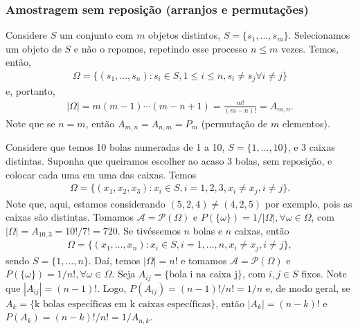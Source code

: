 \documentclass[../Notas.tex]{subfiles}
\begin{document}
\subsubsection{Amostragem sem reposição (arranjos e permutações)}
Considere $S$ um conjunto com $m$ objetos distintos, $S = \{s_1, \dots, s_m\}$. Selecionamos um objeto de $S$ e não o repomos, repetindo esse processo $n \leq m$ vezes. Temos, então,
\begin{align*}
    \Omega = \{ (s_1, \dots, s_n) : s_i\in S, 1\leq i\leq n, s_i\neq s_j \forall i\neq j \}
\end{align*}
e, portanto, 
\begin{align*}
    |\Omega| = m(m-1)\cdots (m - n + 1) = \frac{m!}{(m-n)!} = A_{m,n}.
\end{align*}
Note que se $n=m$, então $A_{m,n} = A_{n,m} = P_m$ (permutação de $m$ elementos).

\begin{example}
Considere que temos 10 bolas numeradas de 1 a 10, $S = \{ 1, \dots, 10 \}$, e 3 caixas distintas. Suponha que queiramos escolher ao acaso 3 bolas, sem reposição, e colocar cada uma em uma das caixas. Temos
\begin{align*}
    \Omega = \{ (x_1, x_2, x_3) : x_i\in S, i=1,2,3, x_i\neq x_j, i\neq j \}.
\end{align*}
Note que, aqui, estamos considerando $(5,2,4)\neq (4,2,5)$ por exemplo, pois as caixas são distintas. Tomamos $\mathcal{A} = \mathcal{P}(\Omega)$ e $P(\{\omega\}) = 1/|\Omega|, \forall \omega\in\Omega$, com $|\Omega| = A_{10,3} = 10!/7! = 720$. Se tivéssemos $n$ bolas e $n$ caixas, então
\begin{align*}
    \Omega = \{ (x_1, \dots, x_n) : x_i\in S, i=1, \dots, n, x_i\neq x_j, i\neq j \},
\end{align*}
sendo $S = \{1, \dots, n\}$. Daí, temos $|\Omega| = n!$ e tomamos $\mathcal{A} = \mathcal{P}(\Omega)$ e $P(\{\omega\}) = 1/n!, \forall\omega\in\Omega$. Seja $A_{ij} = \{\text{bola i na caixa j}\}$, com $i , j\in S$ fixos. Note que $|A_{ij}| = (n-1)!$. Logo, $P(A_{ij}) = (n-1)!/n! = 1/n$ e, de modo geral, se $A_k = \{ \text{k bolas específicas em k caixas específicas} \}$, então $|A_k| = (n-k)!$ e $P(A_k) = (n-k)!/n! = 1/A_{n,k}$.
\end{example}
\end{document}
